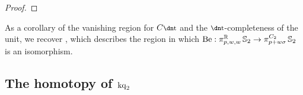 \begin{proof}

\end{proof}

\begin{rmk}
  As a corollary of the vanishing region for $C\ta$ and the $\ta$-completeness of the unit, we recover \cite[Theorem 1.1]{c2stems}, which describes the region in which $\mathrm{Be} : \pi_{p,w,w}^{\mathbb{R}} \operatorname{\mathbb{S}}_2 \to \pi_{p+w\sigma}^{C_2} \operatorname{\mathbb{S}}_2$ is an isomorphism.
\end{rmk}
  
 \subsection{The homotopy of $\mathrm{kq}_2$}\
 
  




